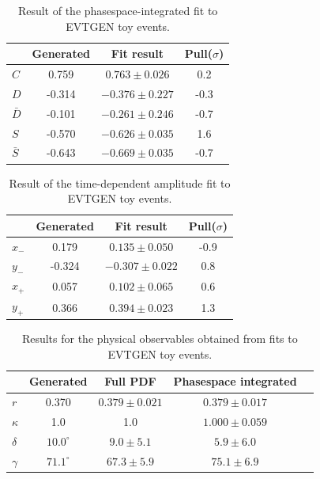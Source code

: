 \begin{table}[h]
\caption{Result of the phasespace-integrated fit to \textsf{EVTGEN} toy events.} 		
  \centering
  \begin{tabular}
    {l c c c}
    \hline \hline
    & Generated &  Fit result  & Pull($\sigma$) \\   \hline
    $C$ & 0.759  &  $0.763 \pm 0.026 $  & 0.2 	 \\
    $D$ &  -0.314 &  $-0.376 \pm 0.227$ & -0.3	 \\
    $\bar D$ &  -0.101 &  $-0.261 \pm 0.246$ & -0.7	 \\
    $S$ &   -0.570 &  $-0.626 \pm 0.035$	& 1.6 \\
    $\bar S$ &  -0.643   &  $-0.669\pm 0.035$ & -0.7	 \\
    \hline \hline
  \end{tabular}
    \label{tab:FitGenMC}
\end{table}

\begin{table}[h]
\caption{Result of the time-dependent amplitude fit to \textsf{EVTGEN} toy events.} 		
  \centering
  \begin{tabular}
    {l c c c}
    \hline \hline
    & Generated &  Fit result & Pull($\sigma$) \\   \hline
    $x_-$ & 0.179  &  $0.135 \pm 0.050$ & -0.9	 \\
    $y_-$ &  -0.324 & $-0.307 \pm 0.022$ 	& 0.8 \\
    $x_+$ &  0.057 & $0.102 \pm 0.065$ & 0.6	 \\
    $y_+$ &   0.366 &  $0.394 \pm 0.023$	& 1.3 \\
    \hline \hline
  \end{tabular}
    \label{tab:FitGenMC2}
\end{table}

\begin{table}[h]
\caption{Results for the physical observables obtained from fits to \textsf{EVTGEN} toy events.} 		
  \centering
  \begin{tabular}
    {l c c c c}
    \hline \hline
    & Generated &  Full PDF     &   Phasespace integrated  \\   \hline
	$r$ & 0.370 & $0.379 \pm 0.021 $ & $0.379 \pm 0.017$  \\
	$\kappa$  &1.0 & 1.0 &  $1.000 \pm  0.059$  \\
	$\delta$ & $10.0^\circ$ &  $9.0 \pm  5.1$ & $5.9 \pm  6.0$   \\
	$\gamma$ & $71.1^\circ$ &   $67.3 \pm 5.9$ &  $75.1 \pm 6.9$\\
    \hline \hline
  \end{tabular}
      \label{tab:FitGenMC3}
\end{table}


